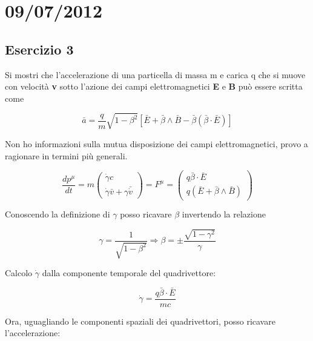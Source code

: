 \chapter*{09/07/2012}
\section*{Esercizio 3}
Si mostri che l'accelerazione di una particella di massa m e carica q che si muove con velocità
\textbf v sotto l'azione dei campi elettromagnetici \textbf E e \textbf B può essere scritta come

\begin{equation}
\bar a = \frac{q}{m} \sqrt{1 - \beta^2} [\bar E + \bar{\beta} \wedge \bar B - \bar \beta (\bar \beta \cdot \bar E)]
\end{equation}

Non ho informazioni sulla mutua disposizione dei campi elettromagnetici, provo
a ragionare in termini più generali.

\begin{equation}
\frac{dp^\mu}{dt} = m 
\left( \begin{array}{c}
\dot \gamma c \\
\dot \gamma \bar v + \gamma \bar{\dot v}
\end{array} \right)
 = F^\mu =
\left( \begin{array}{c}
q \bar \beta \cdot \bar E \\
q(\bar E + \bar \beta \wedge \bar B)
\end{array} \right)
\end{equation}

Conoscendo la definizione di $\gamma$ posso ricavare $\beta$ invertendo la relazione

\begin{equation}
\gamma = \frac{1}{\sqrt{1-\beta^2}} \Rightarrow \beta= \pm \frac{\sqrt{1-\gamma^2}}{\gamma}
\end{equation}

Calcolo $\dot \gamma$ dalla componente temporale del quadrivettore:

\begin{equation}
\dot \gamma = \frac{q\bar \beta \cdot \bar E}{mc}
\end{equation}

Ora, uguagliando le componenti spaziali dei quadrivettori, posso ricavare l'accelerazione:

